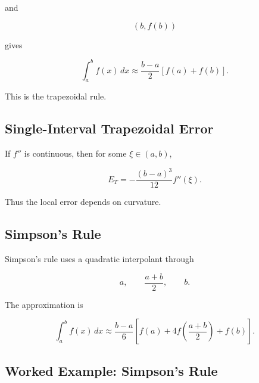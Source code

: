 and

\[
(b,f(b))
\]

gives

\[
\boxed{
\int_a^b
f(x)\,dx
\approx
\frac{
b-a
}{
2
}
[
f(a)+f(b)
].
}
\]

This is the trapezoidal rule.

\subsection{Single-Interval Trapezoidal Error}
\label{subsec:trapezoidal-error-single}

If \(f''\) is continuous, then for some \(\xi\in(a,b)\),

\[
\boxed{
E_T
=
-
\frac{
(b-a)^3
}{
12
}
f''(\xi).
}
\]

Thus the local error depends on curvature.

\subsection{Simpson's Rule}
\label{subsec:simpsons-rule}

Simpson's rule uses a quadratic interpolant through

\[
a,
\qquad
\frac{a+b}{2},
\qquad
b.
\]

The approximation is

\[
\boxed{
\int_a^b
f(x)\,dx
\approx
\frac{
b-a
}{
6
}
\left[
f(a)
+
4f
\left(
\frac{a+b}{2}
\right)
+
f(b)
\right].
}
\]

\subsection{Worked Example: Simpson's Rule}
\label{subsec:worked-simpson}

